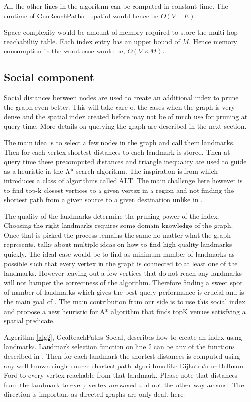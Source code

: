 All the other lines in the algorithm can be computed in constant time. The runtime of GeoReachPaths - spatial would hence be $O(V + E)$.

Space complexity would be amount of memory required to store the multi-hop reachability table. Each index entry has an upper bound of $M$. Hence memory consumption in the worst case would be, $O(V \times M)$.

\subsection{Social component}
Social distances between nodes are used to create an additional index to prune the graph even better. This will take care of the cases when the graph is very dense and the spatial index created before may not be of much use for pruning at query time. More details on querying the graph are described in the next section.

The main idea is to select a few nodes in the graph and call them landmarks. Then for each vertex shortest distances to each landmark is stored. Then at query time these precomputed distances and triangle inequality are used to guide as a heuristic in the A* search algorithm. The inspiration is from \cite{AC2005} which introduces a class of algorithms called ALT. The main challenge here however is to find top-k closest vertices to a given vertex in a region and not finding the shortest path from a given source to a given destination unlike in \cite{AC2005}.

The quality of the landmarks determine the pruning power of the index. Choosing the right landmarks requires some domain knowledge of the graph. Once that is picked the process remains the same no matter what the graph represents. \cite{AC2005} talks about multiple ideas on how to find high quality landmarks quickly. The ideal case would be to find as minimum number of landmarks as possible such that every vertex in the graph is connected to at least one of the landmarks.  However leaving out a few vertices that do not reach any landmarks will not hamper the correctness of the algorithm. Therefore finding a sweet spot of number of landmarks which gives the best query performance is crucial and is the main goal of \cite{AC2005}. The main contribution from our side is to use this social index and propose a new heuristic for A* algorithm that finds topK venues satisfying a spatial predicate.

Algorithm \ref{alg2}, GeoReachPaths-Social, describes how to create an index using landmarks. Landmark selection function on line 2 can be any of the functions described in \cite{AC2005}. Then for each landmark the shortest distances is computed using any well-known single source shortest path algorithms like Dijkstra's or Bellman Ford to every vertex reachable from that landmark. Please note that distances from the landmark to every vertex are saved and not the other way around. The direction is important as directed graphs are only dealt here.

